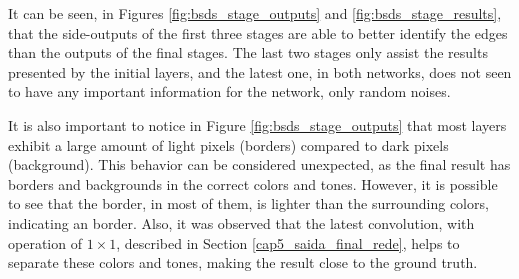 
It can be seen, in Figures \ref{fig:bsds_stage_outputs} and \ref{fig:bsds_stage_results}, that the side-outputs of the first three stages are able to better identify the edges than the outputs of the final stages.
The last two stages only assist the results presented by the initial layers, and the latest one, in both networks, does not seen to have any important information for the network, only random noises.

It is also important to notice in Figure \ref{fig:bsds_stage_outputs} that most layers exhibit a large amount of light pixels (borders) compared to dark pixels (background).
This behavior can be considered unexpected, as the final result has borders and backgrounds in the correct colors and tones.
However, it is possible to see that the border, in most of them, is lighter than the surrounding colors, indicating an border.
Also, it was observed that the latest convolution, with operation of $1 \times 1$, described in Section \ref{cap5_saida_final_rede}, helps to separate these colors and tones, making the result close to the ground truth.




